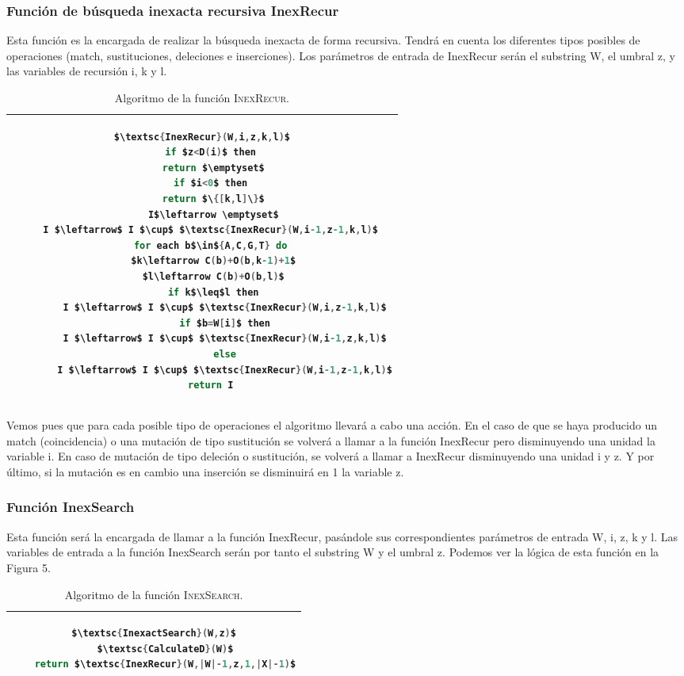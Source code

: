 \documentclass{article}
\newcommand{\tempcaption}{}
\newenvironment{codesnip}[1]{
\begin{table}[h!]
\gdef\tempcaption{#1}
\centering
\begin{tabular}{|c|}
\hline}
{\\\hline
\end{tabular}
\caption{\tempcaption}
\end{table}}
\begin{document}
\subsubsection{Función de búsqueda inexacta recursiva InexRecur}
\vspace{-0.7cm}
Esta función es la encargada de realizar la búsqueda inexacta de forma
recursiva.   Tendrá  en  cuenta  los  diferentes  tipos  posibles   de
operaciones (match, sustituciones,  deleciones	e  inserciones).   Los
parámetros de entrada de InexRecur serán el substring W, el umbral  z,
y las variables de recursión i, k y l.
\begin{codesnip}{Algoritmo de la función \textsc{InexRecur}.\cite{li_durbin_2009}}
\begin{lstlisting}[mathescape=true, language = C]
$\textsc{InexRecur}(W,i,z,k,l)$
   if $z<D(i)$ then
   	return $\emptyset$
   if $i<0$ then
   	return $\{[k,l]\}$
	I$\leftarrow \emptyset$
   I $\leftarrow$ I $\cup$ $\textsc{InexRecur}(W,i-1,z-1,k,l)$
   for each b$\in${A,C,G,T} do
   	$k\leftarrow C(b)+O(b,k-1)+1$
   	$l\leftarrow C(b)+O(b,l)$
   	if k$\leq$l then
   	    I $\leftarrow$ I $\cup$ $\textsc{InexRecur}(W,i,z-1,k,l)$
   	    if $b=W[i]$ then
   		I $\leftarrow$ I $\cup$ $\textsc{InexRecur}(W,i-1,z,k,l)$
   	    else
   		I $\leftarrow$ I $\cup$ $\textsc{InexRecur}(W,i-1,z-1,k,l)$
   return I
\end{lstlisting}
\end{codesnip}

Vemos pues que para cada posible tipo de operaciones el algoritmo
llevará a cabo una acción.  En el caso de que se haya producido un
match (coincidencia) o una mutación de tipo sustitución se volverá a
llamar a la función InexRecur pero disminuyendo una unidad la variable
i. En caso de mutación de tipo deleción o sustitución, se volverá a
llamar a InexRecur disminuyendo una unidad i y z. Y por último, si la
mutación es en cambio una inserción se disminuirá en 1 la variable z.

\subsubsection{Función InexSearch}

Esta función será la encargada de llamar a la función InexRecur,
pasándole sus correspondientes parámetros de entrada W, i, z, k y l.
Las variables de entrada a la función InexSearch serán por tanto el
substring W y el umbral z.  Podemos ver la lógica de esta función en
la Figura 5.
\\
\begin{codesnip}{Algoritmo de la función \textsc{InexSearch}.\cite{li_durbin_2009}}
\begin{lstlisting}[mathescape=true, language = C]
$\textsc{InexactSearch}(W,z)$
	$\textsc{CalculateD}(W)$
	return $\textsc{InexRecur}(W,|W|-1,z,1,|X|-1)$
\end{lstlisting}
\end{codesnip}
\end{document}
